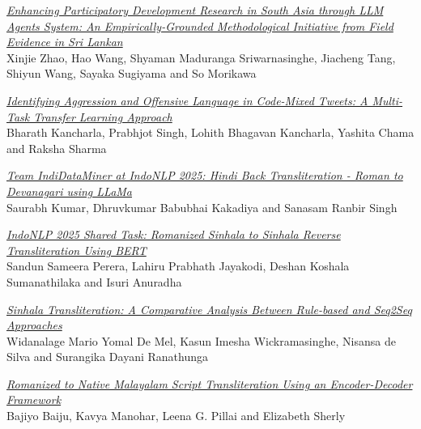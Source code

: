 \hyperlink{page.134}{\em Enhancing Participatory Development Research in South Asia through LLM Agents System: An Empirically-Grounded Methodological Initiative from Field Evidence in Sri Lankan}\samepage \\
\hspace*{7mm} Xinjie Zhao, Hao Wang, Shyaman Maduranga Sriwarnasinghe, Jiacheng Tang, Shiyun Wang, Sayaka Sugiyama and So Morikawa\dotfill {}

\hyperlink{page.148}{\em Identifying Aggression and Offensive Language in Code-Mixed Tweets: A Multi-Task Transfer Learning Approach}\samepage \\
\hspace*{7mm} Bharath Kancharla, Prabhjot Singh, Lohith Bhagavan Kancharla, Yashita Chama and Raksha Sharma\dotfill {}

\hyperlink{page.155}{\em Team IndiDataMiner at IndoNLP 2025: Hindi Back Transliteration - Roman to Devanagari using LLaMa}\samepage \\
\hspace*{7mm} Saurabh Kumar, Dhruvkumar Babubhai Kakadiya and Sanasam Ranbir Singh\dotfill {}

\hyperlink{page.161}{\em IndoNLP 2025 Shared Task: Romanized Sinhala to Sinhala Reverse Transliteration Using BERT}\samepage \\
\hspace*{7mm} Sandun Sameera Perera, Lahiru Prabhath Jayakodi, Deshan Koshala Sumanathilaka and Isuri Anuradha\dotfill {}

\hyperlink{page.168}{\em Sinhala Transliteration: A Comparative Analysis Between Rule-based and Seq2Seq Approaches}\samepage \\
\hspace*{7mm} Widanalage Mario Yomal De Mel, Kasun Imesha Wickramasinghe, Nisansa de Silva and Surangika Dayani Ranathunga\dotfill {}

\hyperlink{page.177}{\em Romanized to Native Malayalam Script Transliteration Using an Encoder-Decoder Framework}\samepage \\
\hspace*{7mm} Bajiyo Baiju, Kavya Manohar, Leena G. Pillai and Elizabeth Sherly\dotfill {}

